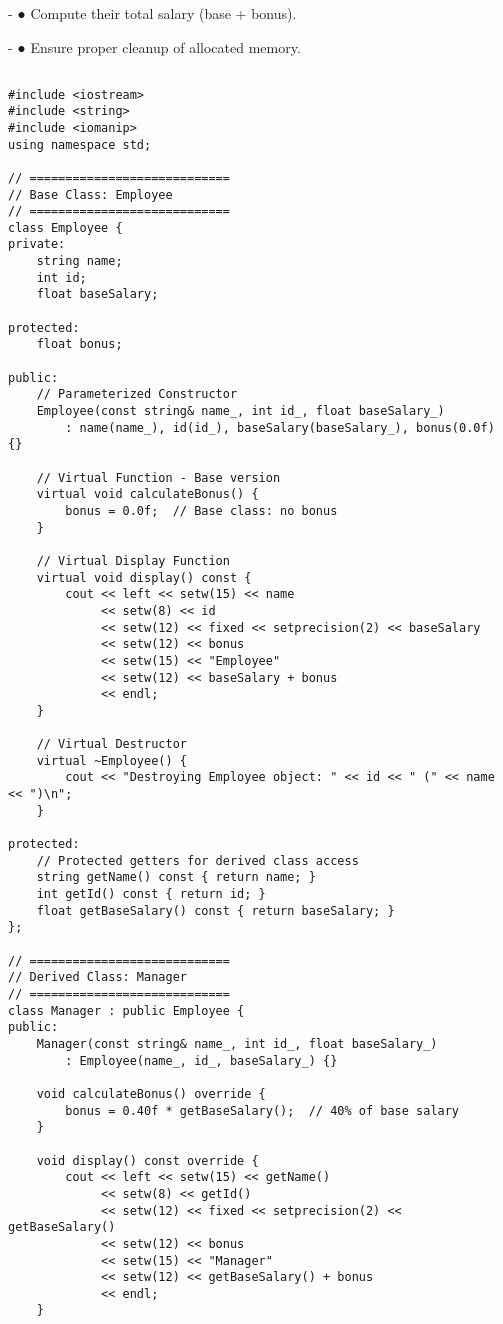 \documentclass[12pt,a4paper]{article}
\begin{document}
    \item - ● Compute their total salary (base + bonus).
    \item - ● Ensure proper cleanup of allocated memory.
\subsection{}
\begin{lstlisting}
#include <iostream>
#include <string>
#include <iomanip>
using namespace std;

// ============================
// Base Class: Employee
// ============================
class Employee {
private:
    string name;
    int id;
    float baseSalary;

protected:
    float bonus;

public:
    // Parameterized Constructor
    Employee(const string& name_, int id_, float baseSalary_)
        : name(name_), id(id_), baseSalary(baseSalary_), bonus(0.0f) {}

    // Virtual Function - Base version
    virtual void calculateBonus() {
        bonus = 0.0f;  // Base class: no bonus
    }

    // Virtual Display Function
    virtual void display() const {
        cout << left << setw(15) << name
             << setw(8) << id
             << setw(12) << fixed << setprecision(2) << baseSalary
             << setw(12) << bonus
             << setw(15) << "Employee"
             << setw(12) << baseSalary + bonus
             << endl;
    }

    // Virtual Destructor
    virtual ~Employee() {
        cout << "Destroying Employee object: " << id << " (" << name << ")\n";
    }

protected:
    // Protected getters for derived class access
    string getName() const { return name; }
    int getId() const { return id; }
    float getBaseSalary() const { return baseSalary; }
};

// ============================
// Derived Class: Manager
// ============================
class Manager : public Employee {
public:
    Manager(const string& name_, int id_, float baseSalary_)
        : Employee(name_, id_, baseSalary_) {}

    void calculateBonus() override {
        bonus = 0.40f * getBaseSalary();  // 40% of base salary
    }

    void display() const override {
        cout << left << setw(15) << getName()
             << setw(8) << getId()
             << setw(12) << fixed << setprecision(2) << getBaseSalary()
             << setw(12) << bonus
             << setw(15) << "Manager"
             << setw(12) << getBaseSalary() + bonus
             << endl;
    }


\end{lstlisting}
\end{document}
